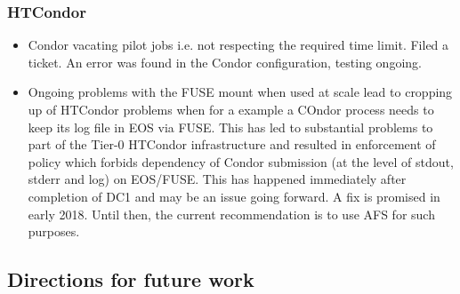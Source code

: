 \documentclass[pdftex,12pt,letter]{article}
\begin{document}
\subsubsection{HTCondor}
\begin{itemize}

\item Condor vacating pilot jobs i.e. not respecting the required time limit. Filed a ticket. An error was found in the Condor configuration, testing ongoing.

\item Ongoing problems with the FUSE mount when used at scale lead to cropping up of HTCondor problems when for a example a COndor
process needs to keep its log file in EOS via FUSE. This has led to substantial problems to part of the Tier-0 HTCondor infrastructure and
resulted in enforcement of policy which forbids dependency of Condor submission (at the level of stdout, stderr and log) on EOS/FUSE.
This has happened immediately after completion of DC1 and may be an issue going forward. A fix is promised in early 2018. Until then,
the current recommendation is to use AFS for such purposes.

\end{itemize}

 
\subsection{Directions for future work}
\end{document}
